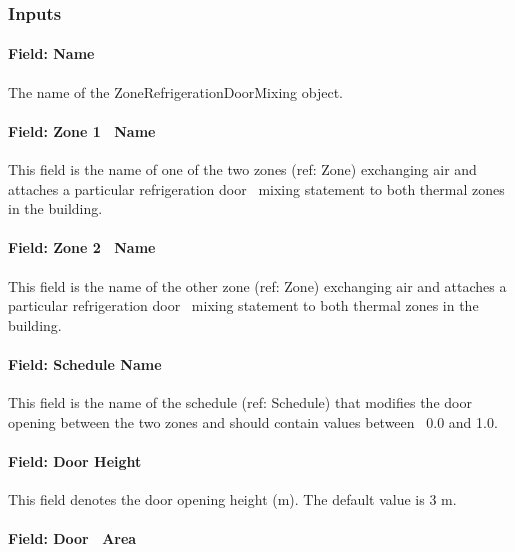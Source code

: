 \subsubsection{Inputs}\label{inputs-7-003}

\paragraph{Field: Name}\label{field-name-7-002}

The name of the ZoneRefrigerationDoorMixing object.

\paragraph{Field: Zone 1~ Name}\label{field-zone-1-name}

This field is the name of one of the two zones (ref: Zone) exchanging air and attaches a particular refrigeration door~ mixing statement to both thermal zones in the building.

\paragraph{Field: Zone 2~ Name}\label{field-zone-2-name}

This field is the name of the other zone (ref: Zone) exchanging air and attaches a particular refrigeration door~ mixing statement to both thermal zones in the building.

\paragraph{Field: Schedule Name}\label{field-schedule-name-5}

This field is the name of the schedule (ref: Schedule) that modifies the door opening between the two zones and should contain values between~ 0.0 and 1.0.

\paragraph{Field: Door Height}\label{field-door-height}

This field denotes the door opening height (m). The default value is 3 m.

\paragraph{Field: Door~ Area}\label{field-door-area}

